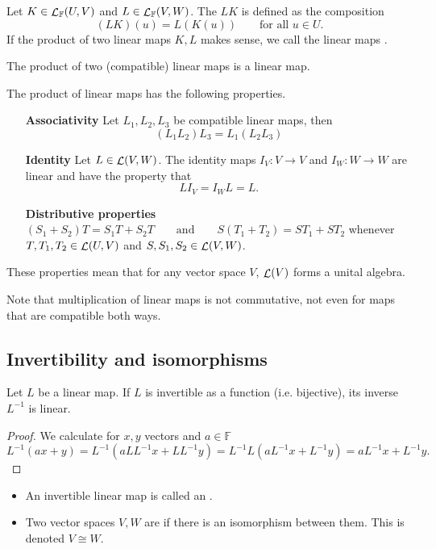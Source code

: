 \begin{definition}
Let $K\in \mathop{\mathcal{L}}_\mathbb{F}(U,V)$ and $L\in \mathop{\mathcal{L}}_\mathbb{F}(V,W)$. The  $LK$ is defined as the composition
\[ (LK)(u) = L(K(u)) \qquad \text{for all $u\in U$.} \]
If the product of two linear maps $K,L$ makes sense, we call the linear maps .
\end{definition}
\begin{proposition}
The product of two (compatible) linear maps is a linear map.
\end{proposition}
\begin{proposition}
The product of linear maps has the following properties. 
\begin{itemize}[leftmargin=4.2cm]
\item[\textbf{Associativity}] Let $L_1, L_2, L_3$ be compatible linear maps, then
\[ (L_1L_2)L_3 = L_1(L_2L_3) \]
\item[\textbf{Identity}] Let $L\in \mathop{\mathcal{L}}(V,W)$. The identity maps $I_V:V\to V$ and $I_W:W\to W$ are linear and have the property that
\[ LI_V = I_W L = L. \]
\item[\textbf{Distributive properties}]
$ (S_1+S_2)T = S_1T + S_2T \qquad \text{and} \qquad S(T_1 + T_2) = ST_1 + ST_2 $
whenever $T,T_1, T_2 \in \mathop{\mathcal{L}}(U,V)$ and $S,S_1, S_2\in \mathop{\mathcal{L}}(V,W)$.
\end{itemize}
These properties mean that for any vector space $V$, $\mathop{\mathcal{L}}(V)$ forms a unital algebra.
\end{proposition}
Note that multiplication of linear maps is not commutative, not even for maps that are compatible both ways.

\subsection{Invertibility and isomorphisms}
\begin{proposition} \label{prop:inverseLinear}
Let $L$ be a linear map. If $L$ is invertible as a function (i.e. bijective), its inverse $L^{-1}$ is linear.
\end{proposition}
\begin{proof}
We calculate for $x,y$ vectors and $a\in\mathbb{F}$
\[ L^{-1}(ax + y) = L^{-1}(aLL^{-1}x + LL^{-1}y) = L^{-1}L(aL^{-1}x + L^{-1}y) = aL^{-1}x + L^{-1}y. \]
\end{proof}

\begin{definition}
\begin{itemize}
\item An invertible linear map is called an .
\item Two vector spaces $V,W$  are  if there is an isomorphism between them. This is denoted $V\cong W$.
\end{itemize}
\end{definition}

